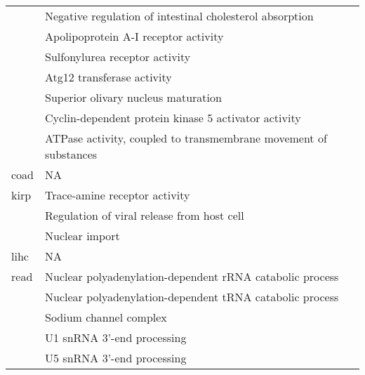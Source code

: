 \begin{appendices}
\begin{longtable}{lp{}}
									 & Negative regulation of intestinal cholesterol absorption                                        \\
									 & Apolipoprotein A-I receptor activity                                                            \\
									 & Sulfonylurea receptor activity                                                                  \\
									 & Atg12 transferase activity                                                                      \\
									 & Superior olivary nucleus maturation                                                             \\
									 & Cyclin-dependent protein kinase 5 activator activity                                            \\
									 & ATPase activity, coupled to transmembrane movement of substances                                \\
		\hline
		\gls{coad}                   & NA \tnote{1}                                                                                     \\
		\hline
		\gls{kirp}                   & Trace-amine receptor activity                                                                   \\
									 & Regulation of viral release from host cell                                                      \\
									 & Nuclear import                                                                                  \\
		\hline
		\gls{lihc}                   & NA                                                                                              \\
		\hline
		\gls{read}                   & Nuclear polyadenylation-dependent rRNA catabolic process                                        \\
									 & Nuclear polyadenylation-dependent tRNA catabolic process                                        \\
									 & Sodium channel complex                                                                          \\
									 & U1 snRNA 3'-end processing                                                                      \\
									 & U5 snRNA 3'-end processing                                                                      \\

\end{longtable}
\end{appendices}
